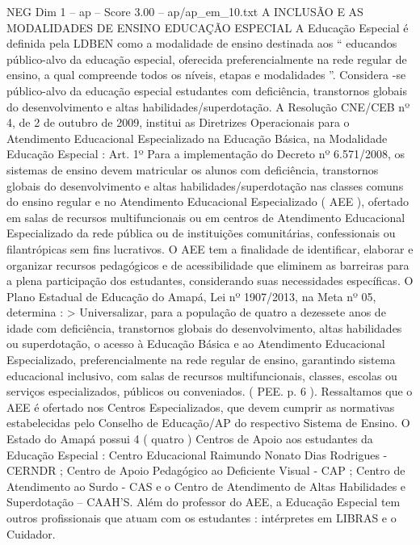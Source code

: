 \begin{textsample}{NEG Dim 1 – ap – Score 3.00 – ap/ap\_em\_10.txt}  \label{ex:f1_neg_125}
A INCLUSÃO E AS MODALIDADES DE ENSINO EDUCAÇÃO ESPECIAL A Educação Especial é definida pela LDBEN como a modalidade de ensino destinada aos “ educandos público-alvo da educação especial, oferecida preferencialmente na rede regular de ensino, a qual compreende todos os níveis, etapas e modalidades ”.
Considera -se público-alvo da educação especial estudantes com deficiência, transtornos globais do desenvolvimento e altas habilidades/superdotação.
A Resolução CNE/CEB nº 4, de 2 de outubro de 2009, institui as Diretrizes Operacionais para o Atendimento Educacional Especializado na Educação Básica, na Modalidade Educação Especial : Art. 1º Para a implementação do Decreto nº 6.571/2008, os sistemas de ensino devem matricular os alunos com deficiência, transtornos globais do desenvolvimento e altas habilidades/superdotação nas classes comuns do ensino regular e no Atendimento Educacional Especializado ( AEE ), ofertado em salas de recursos multifuncionais ou em centros de Atendimento Educacional Especializado da rede pública ou de instituições comunitárias, confessionais ou filantrópicas sem fins lucrativos.
O AEE tem a finalidade de identificar, elaborar e organizar recursos pedagógicos e de acessibilidade que eliminem as barreiras para a plena participação dos estudantes, considerando suas necessidades específicas.
O Plano Estadual de Educação do Amapá, Lei nº 1907/2013, na Meta nº 05, determina : > Universalizar, para a população de quatro a dezessete anos de idade com deficiência, transtornos globais do desenvolvimento, altas habilidades ou superdotação, o acesso à Educação Básica e ao Atendimento Educacional Especializado, preferencialmente na rede regular de ensino, garantindo sistema educacional inclusivo, com salas de recursos multifuncionais, classes, escolas ou serviços especializados, públicos ou conveniados. ( PEE. p. 6 ).
Ressaltamos que o AEE é ofertado nos Centros Especializados, que devem cumprir as normativas estabelecidas pelo Conselho de Educação/AP do respectivo Sistema de Ensino.
O Estado do Amapá possui 4 ( quatro ) Centros de Apoio aos estudantes da Educação Especial : Centro Educacional Raimundo Nonato Dias Rodrigues - CERNDR ; Centro de Apoio Pedagógico ao Deficiente Visual - CAP ; Centro de Atendimento ao Surdo - CAS e o Centro de Atendimento de Altas Habilidades e Superdotação – CAAH'S.
Além do professor do AEE, a Educação Especial tem outros profissionais que atuam com os estudantes : intérpretes em LIBRAS e o Cuidador.

\end{textsample}
